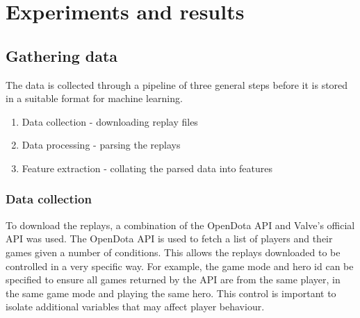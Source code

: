 \documentclass{SizheArticle}
\begin{document}
\section{Experiments and results}

\subsection{Gathering data}
The data is collected through a pipeline of three general steps before it is stored in a suitable format for machine learning. 
\begin{enumerate}
\item Data collection - downloading replay files
\item Data processing - parsing the replays
\item Feature extraction - collating the parsed data into features
\end{enumerate}

\subsubsection{Data collection}
To download the replays, a combination of the OpenDota \cite{opendota} API and Valve's official API was used. The OpenDota API is used to fetch a list of players and their games given a number of conditions. This allows the replays downloaded to be controlled in a very specific way. For example, the game mode and hero id can be specified to ensure all games returned by the API are from the same player, in the same game mode and playing the same hero. This control is important to isolate additional variables that may affect player behaviour. 
\end{document}
